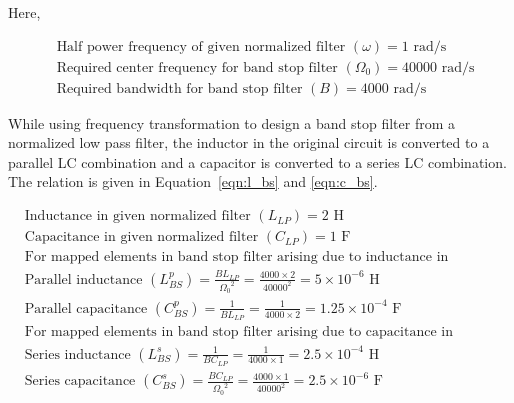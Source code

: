 \documentclass{lab_sheet}
\begin{document}
\pagebreak
Here,
\begin{fleqn}[\parindent]
   \begin{equation*}
      \begin{split}
         &\text{Half power frequency of given normalized filter } (\omega)=1 \text{ rad/s}\\
         &\text{Required center frequency for band stop filter }(\Omega_0)=40000 \text{ rad/s} \\
         &\text{Required bandwidth for band stop filter }(B)=4000 \text{ rad/s}
         \end{split}
      \end{equation*}
\end{fleqn}
While using frequency transformation to design a band stop filter from a normalized low pass filter, the inductor in the original circuit is converted to a parallel LC combination and a capacitor is converted to a series LC combination. The relation is given in Equation~\ref{eqn:l_bs} and \ref{eqn:c_bs}.
\begin{fleqn}[\parindent]
   \begin{equation*}
      \begin{split}
         &\text{Inductance in given normalized filter } (L_{LP})=2 \text{ H}\\
         &\text{Capacitance in given normalized filter } (C_{LP})=1 \text{ F}\\
         &\text{For mapped elements in band stop filter arising due to inductance in normalized filter:}\\
         &\text{Parallel inductance }(L_{BS}^p)=\frac{BL_{LP}}{{\Omega_0}^2}=\frac{4000\times2}{40000^2}=5\times10^{-6}\text{ H}\\
         &\text{Parallel capacitance }(C_{BS}^p)=\frac{1}{BL_{LP}}=\frac{1}{4000\times2}=1.25\times10^{-4}\text{ F}\\
         &\text{For mapped elements in band stop filter arising due to capacitance in normalized filter:}\\
         &\text{Series inductance }(L_{BS}^s)=\frac{1}{BC_{LP}}=\frac{1}{4000\times1}=2.5\times10^{-4}\text{ H}\\
         &\text{Series capacitance }(C_{BS}^s)=\frac{BC_{LP}}{{\Omega_0}^2}=\frac{4000\times1}{40000^2}=2.5\times10^{-6}\text{ F}\\
         \end{split}
      \end{equation*}
\end{fleqn}
\end{document}
